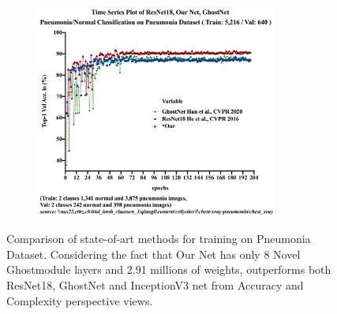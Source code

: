 \begin{figure}[b]
\centering
\includegraphics[height=200pt,width=0.9\textwidth]{thesis-template-master/images/Pneumonia_TimeSeries-1.png}
\label{fig}
\centering
\caption{ Comparison of state-of-art methods for training on Pneumonia Dataset. Considering the fact that Our Net has only 8 Novel Ghostmodule layers and 2.91 millions of weights, outperforms both ResNet18, GhostNet and InceptionV3 net from Accuracy and Complexity perspective views.}
\end{figure}


